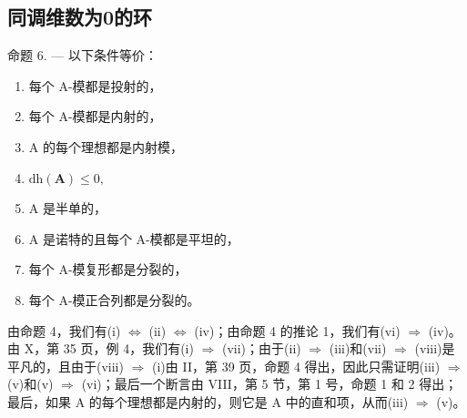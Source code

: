 \subsection{同调维数为0的环}

命题 6. --- 以下条件等价：

\begin{enumerate}
\def\labelenumi{(\roman{enumi})}
\item
  每个 A-模都是投射的，
\item
  每个 A-模都是内射的，
\item
  A 的每个理想都是内射模，
\item
  \(\mathrm{dh}(\mathbf{A})\leqslant 0,\)
\item
  A 是半单的，
\item
  A 是诺特的且每个 A-模都是平坦的，
\item
  每个 A-模复形都是分裂的，
\item
  每个 A-模正合列都是分裂的。
\end{enumerate}

由命题 4，我们有(i) \(\Leftrightarrow\) (ii) \(\Leftrightarrow\) (iv)；由命题 4 的推论 1，我们有(vi) \(\Rightarrow\) (iv)。由 X，第 35 页，例 4，我们有(i) \(\Rightarrow\) (vii)；由于(ii) \(\Rightarrow\) (iii)和(vii) \(\Rightarrow\) (viii)是平凡的，且由于(viii) \(\Rightarrow\) (i)由 II，第 39 页，命题 4 得出，因此只需证明(iii) \(\Rightarrow\) (v)和(v) \(\Rightarrow\) (vi)；最后一个断言由 VIII，第 5 节，第 1 号，命题 1 和 2 得出；最后，如果 A 的每个理想都是内射的，则它是 A 中的直和项，从而(iii) \(\Rightarrow\) (v)。

